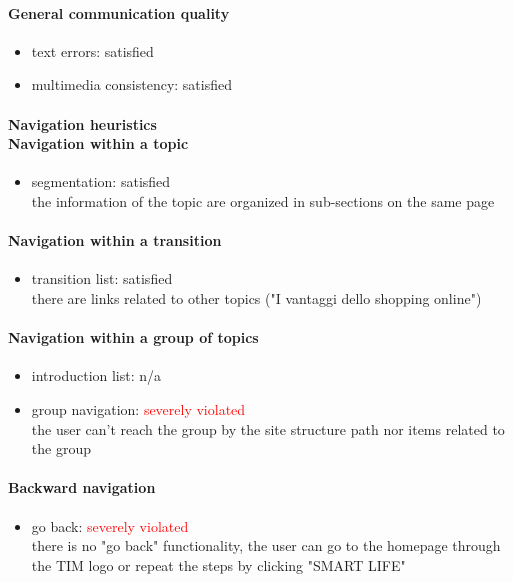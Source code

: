\begin{enumerate}
	\paragraph*{General communication quality}
	\begin{itemize}
		\item text errors: satisfied
		\item multimedia consistency: satisfied
	\end{itemize}
	
	\paragraph*{Navigation heuristics \\ Navigation within a topic}
	\begin{itemize}
		\item segmentation: satisfied\\
		the information of the topic are organized in sub-sections on the same page 
	\end{itemize}	
	
	\paragraph*{Navigation within a transition}
	\begin{itemize}
		\item transition list: satisfied\\
		there are links related to other topics ("I vantaggi dello shopping online")
	\end{itemize}
	
	\paragraph*{Navigation within a group of topics}
	\begin{itemize}
		\item introduction list: n/a
		\item group navigation: \textcolor{red}{severely violated}\\
		the user can't reach the group by the site structure path nor items related to the group
	\end{itemize}
	
	\paragraph*{Backward navigation}
	\begin{itemize}
		\item go back: \textcolor{red}{severely violated}\\
		there is no "go back" functionality, the user can go to the homepage through the TIM logo or repeat the steps by clicking "SMART LIFE"
	\end{itemize}
	

\end{enumerate}
